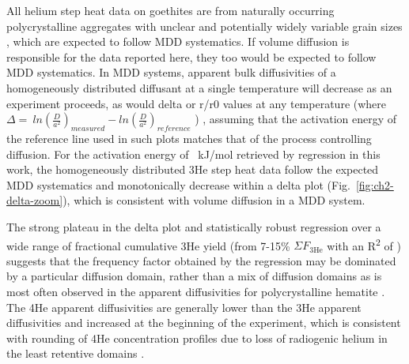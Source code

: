 All helium step heat data on goethites are from naturally occurring
polycrystalline aggregates with unclear and potentially widely variable
grain sizes \citep{monteiro2017,farley2024}, which are expected to
follow MDD systematics. If volume diffusion is responsible for the data
reported here, they too would be expected to follow MDD systematics. In
MDD systems, apparent bulk diffusivities of a homogeneously distributed
diffusant at a single temperature will decrease as an experiment
proceeds, as would delta or r/r0 values at any temperature (where
\(\Delta = \ ln\left( \frac{D}{a^{2}} \right)_{measured} - ln\left( \frac{D}{a^{2}} \right)_{reference}\)
) \citep{lovera1991,farley2018}, assuming that the activation
energy of the reference line used in such plots matches that of the
process controlling diffusion. For the activation energy of \ChTwoEa{}~kJ/mol
retrieved by regression in this work, the homogeneously distributed 3He
step heat data follow the expected MDD systematics and monotonically
decrease within a delta plot (Fig.~\ref{fig:ch2-delta-zoom}), which is consistent with
volume diffusion in a MDD system.

The strong plateau in the delta plot and statistically robust regression
over a wide range of fractional cumulative 3He yield (from 7-15\% $\Sigma F_{3\mathrm{He}}$
with an R\textsuperscript{2} of \ChTwoRtwo) suggests that the frequency
factor obtained by the regression may be dominated by a particular
diffusion domain, rather than a mix of diffusion domains as is most
often observed in the apparent diffusivities for polycrystalline
hematite \citep{farley2018}. The 4He apparent diffusivities are generally
lower than the 3He apparent diffusivities and increased at the beginning
of the experiment, which is consistent with rounding of 4He
concentration profiles due to loss of radiogenic helium in the least
retentive domains \citep{shuster2004,shustervasconcelos2005}.

